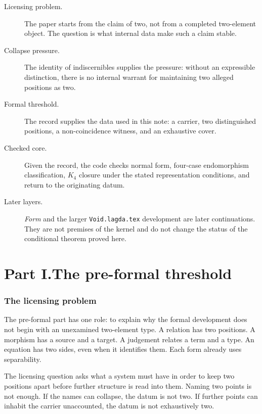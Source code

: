 \documentclass[11pt]{article}
\begin{document}
\begin{description}
\item[Licensing problem.] The paper starts from the claim of two, not
from a completed two-element object.  The question is what internal data
make such a claim stable.

\item[Collapse pressure.] The identity of indiscernibles supplies the
pressure: without an expressible distinction, there is no internal
warrant for maintaining two alleged positions as two.

\item[Formal threshold.] The  record supplies
the data used in this note: a carrier, two distinguished positions, a
non-coincidence witness, and an exhaustive cover.

\item[Checked core.] Given the record, the code checks normal form,
four-case endomorphism classification, $K_4$ closure under the stated
representation conditions, and return to the originating datum.

\item[Later layers.] \emph{Form} and the larger \texttt{Void.lagda.tex}
development are later continuations.  They are not premises of the
kernel and do not change the status of the conditional theorem proved
here.
\end{description}

\part*{Part I.\quad The pre-formal threshold}

\section*{The licensing problem}

The pre-formal part has one role: to explain why the formal development
does not begin with an unexamined two-element type.  A relation has two
positions.  A morphism has a source and a target.  A judgement relates a
term and a type.  An equation has two sides, even when it identifies
them.  Each form already uses separability.

The licensing question asks what a system must have in order to keep two
positions apart before further structure is read into them.  Naming two
points is not enough.  If the names can collapse, the datum is not two.
If further points can inhabit the carrier unaccounted, the datum is not
exhaustively two.
\end{document}
